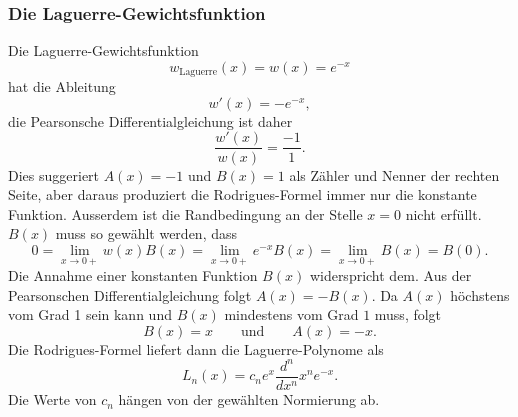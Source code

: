 %
%
\subsubsection{Die Laguerre-Gewichtsfunktion}
Die Laguerre-Gewichtsfunktion
%
%
\[
w_{\text{Laguerre}}(x)
=
w(x)
=
e^{-x}
\]
hat die Ableitung
\[
w'(x) = -e^{-x},
\]
die Pearsonsche Differentialgleichung ist daher
\[
\frac{w'(x)}{w(x)}=\frac{-1}{1}.
\]
Dies suggeriert $A(x)=-1$ und $B(x)=1$ als Zähler und Nenner der rechten
Seite, aber daraus produziert die Rodrigues-Formel immer nur die konstante
Funktion.
Ausserdem ist die Randbedingung an der Stelle $x=0$ nicht erfüllt.
$B(x)$ muss so gewählt werden, dass
\[
0
=
\lim_{x\to 0+} w(x)B(x)
= 
\lim_{x\to 0+} e^{-x}B(x)
=
\lim_{x\to 0+} B(x)
=
B(0).
\]
Die Annahme einer konstanten Funktion $B(x)$ widerspricht dem.
Aus der Pearsonschen Differentialgleichung folgt $A(x)=-B(x)$.
Da $A(x)$ höchstens vom Grad 1 sein kann und $B(x)$ mindestens
vom Grad $1$ muss, folgt
\[
B(x) = x
\qquad\text{und}\qquad
A(x) = -x.
\]
Die Rodrigues-Formel liefert dann die Laguerre-Polynome als
\[
L_n(x) = c_n e^x \frac{d^n}{dx^n} x^ne^{-x}.
\]
Die Werte von $c_n$ hängen von der gewählten Normierung ab.

